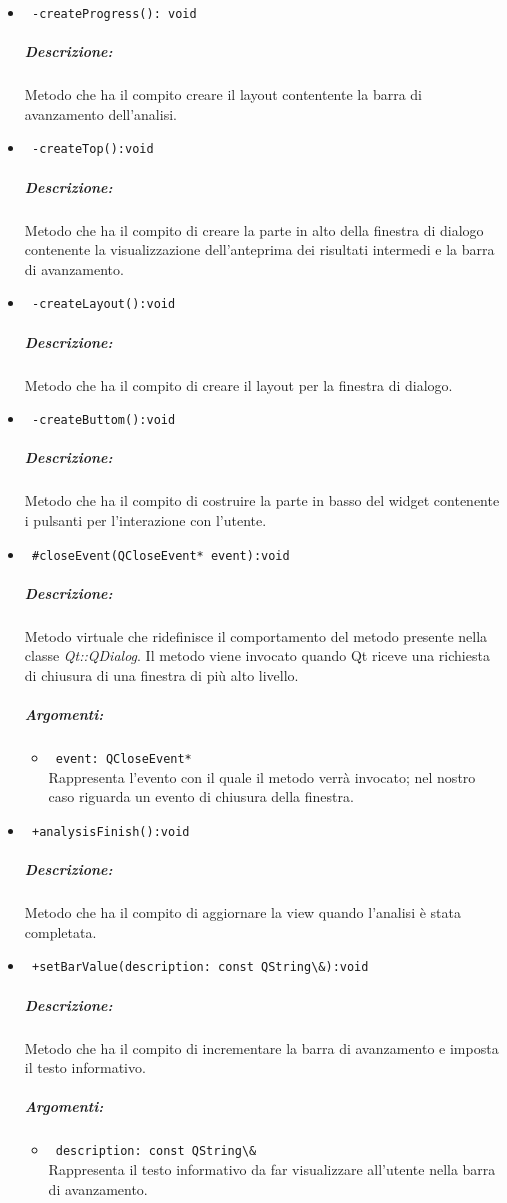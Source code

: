 \begin{itemize}
\item \color{blue}\verb! -createProgress(): void !
\color{black} 
\subparagraph{Descrizione: }Metodo che ha il compito creare il layout contentente la barra di avanzamento dell'analisi.

\item \color{blue}\verb! -createTop():void!
\color{black}
\subparagraph{Descrizione:} Metodo che ha il compito di creare la parte in alto della finestra di dialogo contenente la visualizzazione dell'anteprima dei risultati intermedi e la barra di avanzamento.

\item \color{blue}\verb! -createLayout():void!
\color{black} 
\subparagraph{Descrizione:} Metodo che ha il compito di creare il layout per la finestra di dialogo.

\item \color{blue}\verb! -createButtom():void!
\color{black}
\subparagraph{Descrizione:}
 Metodo che ha il compito di costruire la parte in basso del widget contenente i pulsanti per l'interazione con l'utente.

\item \color{blue}\verb! #closeEvent(QCloseEvent* event):void!
\color{black}
\subparagraph{Descrizione:}
 Metodo virtuale che ridefinisce il comportamento del metodo presente nella classe \textit{Qt::QDialog}. Il metodo viene invocato quando Qt\g{} riceve una richiesta di chiusura di una finestra di più alto livello.
\subparagraph{Argomenti:}
\begin{itemize}
\item \color{RoyalPurple} \verb! event: QCloseEvent* ! \\Rappresenta l'evento con il quale il metodo verrà invocato; nel nostro caso riguarda un evento di chiusura della finestra.
\end{itemize}

\item \color{blue}\verb! +analysisFinish():void!
\color{black}
\subparagraph{Descrizione:}
 Metodo che ha il compito di aggiornare la view quando l'analisi è stata completata.
 
\item \color{blue}\verb! +setBarValue(description: const QString\&):void!
\color{black}
\subparagraph{Descrizione:}
 Metodo che ha il compito di incrementare la barra di avanzamento e imposta il testo informativo.
\subparagraph{Argomenti:}
\begin{itemize}
\item \color{RoyalPurple} \verb! description: const QString\& ! \\ Rappresenta il testo informativo da far visualizzare all'utente nella barra di avanzamento.
\end{itemize}


\end{itemize}
